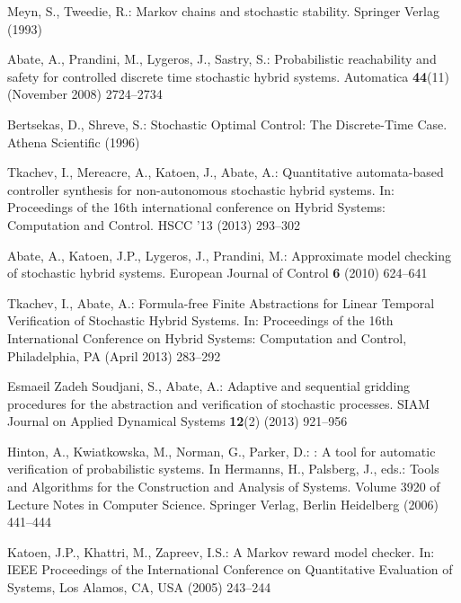 \documentclass{llncs}
\begin{document}
\newpage

\begin{thebibliography}{10}
Meyn, S., Tweedie, R.:
\newblock Markov chains and stochastic stability.
\newblock Springer Verlag (1993)

Abate, A., Prandini, M., Lygeros, J., Sastry, S.:
\newblock Probabilistic reachability and safety for controlled discrete time
  stochastic hybrid systems.
\newblock Automatica \textbf{44}(11) (November 2008)  2724--2734

{Bertsekas}, D., {Shreve}, S.:
\newblock Stochastic {O}ptimal {C}ontrol: {T}he {D}iscrete-{T}ime {C}ase.
\newblock Athena Scientific (1996)

Tkachev, I., Mereacre, A., Katoen, J., Abate, A.:
\newblock Quantitative automata-based controller synthesis for non-autonomous
  stochastic hybrid systems.
\newblock In: Proceedings of the 16th international conference on Hybrid
  Systems: Computation and Control. HSCC '13 (2013)  293--302

Abate, A., Katoen, J.P., Lygeros, J., Prandini, M.:
\newblock Approximate model checking of stochastic hybrid systems.
\newblock European Journal of Control \textbf{6} (2010)  624--641

Tkachev, I., Abate, A.:
\newblock Formula-free {F}inite {A}bstractions for {L}inear {T}emporal
  {V}erification of {S}tochastic {H}ybrid {S}ystems.
\newblock In: Proceedings of the 16th International Conference on Hybrid
  Systems: Computation and Control, Philadelphia, PA (April 2013)  283--292

{Esmaeil Zadeh Soudjani}, S., Abate, A.:
\newblock Adaptive and sequential gridding procedures for the abstraction and
  verification of stochastic processes.
\newblock SIAM Journal on Applied Dynamical Systems \textbf{12}(2) (2013)
  921--956

Hinton, A., Kwiatkowska, M., Norman, G., Parker, D.:
: A tool for automatic verification of probabilistic systems.
\newblock In Hermanns, H., Palsberg, J., eds.: Tools and Algorithms for the
  Construction and Analysis of Systems. Volume 3920 of Lecture Notes in
  Computer Science.
\newblock Springer Verlag, Berlin Heidelberg (2006)  441--444

Katoen, J.P., Khattri, M., Zapreev, I.S.:
\newblock A {M}arkov reward model checker.
\newblock In: IEEE Proceedings of the International Conference on Quantitative
  Evaluation of Systems, Los Alamos, CA, USA (2005)  243--244


\end{thebibliography}
\end{document}
